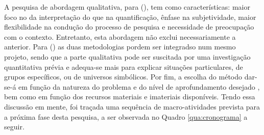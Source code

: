 A pesquisa de abordagem qualitativa, para  (\citeyear{CASELL1994}), tem como características: maior foco no da interpretação do que na quantificação, ênfase na subjetividade, maior flexibilidade na condução do processo de pesquisa e necessidade de preocupação com o contexto.
Entretanto, esta abordagem não exclui necessariamente a anterior. Para  (\citeyear{MINAYO1996}) as duas metodologias pordem ser integradso num mesmo projeto, sendo que a parte qualitativa pode ser suscitada por uma investigação quantitativa prévia e adequa-se mais para explicar situações particulares, de grupos específicos, ou de universos simbólicos.
Por fim, a escolha do método dar-se-á em função da natureza do problema e do nível de aprofundamento desejado \cite{DIEHL2004}, bem como em função dos recursos materiais e imateriais disponíveis.
Tendo essa discussão em mente, foi traçada uma sequência de macro-atividades prevista para a próxima fase desta pesquisa, a ser observada no Quadro \ref{qua:cronograma} a seguir.

